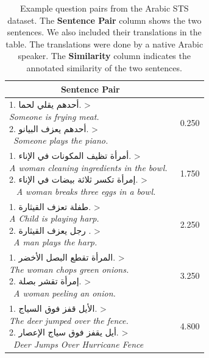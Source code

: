 \begin{table}[ht!]
	\centering 	
	\begin{tabular}{l|c} 
		\hline
		\multicolumn{1}{c|}{\textbf{Sentence Pair}} & 
		\multicolumn{1}{c}{\textbf{\detokenize{Similarity}}}  \\
		\hline
		\makecell[l]
		{	1. \< أحدهم يقلي لحما.  > \\ \textit{Someone is frying meat.}\ \\ 
			2.  \< أحدهم يعزف البيانو.  > \\ \  \textit{Someone plays the piano.} } & 0.250
		\\
		\hline
		\makecell[l]
		{	1. \< أمرأة تظيف المكونات في الإناء.  > \\ \textit{
				A woman cleaning ingredients in the bowl.}\ \\ 
			2.  \< إمرأة تكسر ثلاثة بيضات في الإناء. > \\ \  \textit{
				A woman breaks three eggs in a bowl.} } & 1.750
		\\
		\hline
		\makecell[l]
		{	1. \< طفلة تعزف القيثارة.  > \\ \textit{A Child is playing harp.}\ \\ 
			2.  \< رجل يعزف القيثارة . > \\ \  \textit{A man plays the harp.} } & 2.250
		\\
		\hline
		\makecell[l]
		{	1. \< المرأة تقطع البصل الأخضر.  > \\ \textit{The woman chops green onions.}\ \\ 
			2.  \< إمرأة تقشر بصلة. > \\ \  \textit{A woman peeling an onion.} } & 3.250
		\\
		\hline
		\makecell[l]
		{	1. \< الأيل قفز فوق السياج. > \\ \textit{The deer jumped over the fence.}\ \\ 
			2.  \< أيل يقفز فوق سياج الإعصار. > \\ \  \textit{Deer Jumps Over Hurricane Fence} } & 4.800
		\\
		\hline
		
	\end{tabular}
	\caption[Example question pairs from the Arabic STS dataset]{Example question  pairs from the Arabic STS dataset. The \textbf{Sentence Pair} column shows the two sentences. We also included their translations in the table. The translations were done by a native Arabic speaker. The \textbf{Similarity} column indicates the annotated similarity of the two sentences.}
	\label{tab:arabicdata}
\end{table}  

